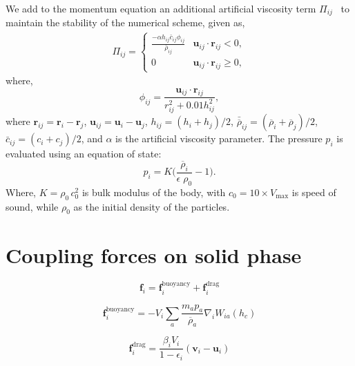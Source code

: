 \documentclass[preprint,12pt]{elsarticle}
\newcommand{\ten}[1]{\ensuremath{\mathbf{#1}}}
\begin{document}
We add to the momentum equation an additional artificial viscosity term
$\Pi_{ij}$~\cite{monaghan-review:2005} to maintain the stability of the
numerical scheme, given as,
\begin{align}
  \label{eq:mom-av}
  \Pi_{ij} =
  \begin{cases}
\frac{-\alpha h_{ij} \bar{c}_{ij} \phi_{ij}}{\bar{\rho}_{ij}}
  & \ten{u}_{ij}\cdot \ten{r}_{ij} < 0, \\
  0 & \ten{u}_{ij}\cdot \ten{r}_{ij} \ge 0,
\end{cases}
\end{align}
where,
%
\begin{equation}
  \label{eq:av-phiij}
  \phi_{ij} = \frac{\ten{u}_{ij} \cdot \ten{r}_{ij}}{r^2_{ij} + 0.01 h^2_{ij}},
\end{equation}
%
where $\ten{r}_{ij} = \ten{r}_i - \ten{r}_j$,
$\ten{u}_{ij} = \ten{u}_i - \ten{u}_j$, $h_{ij} = (h_i + h_j)/2$,
$\bar{\overline{\rho}}_{ij} = (\overline{\rho}_i + \overline{\rho}_j)/2$, $\bar{c}_{ij} = (c_i + c_j) / 2$, and
$\alpha$ is the artificial viscosity parameter.  The pressure $p_i$ is evaluated
using an equation of state:
\begin{equation}
\label{eqn:sph-eos}
  p_i = K \bigg(\frac{\overline{\rho}_i}{\epsilon \; \rho_{0}} - 1 \bigg).
\end{equation}
Where, $K=\rho_0 \, c_0^2$ is bulk modulus of the body, with
$c_0=10 \times V_{\text{max}}$ is speed of sound, while $\rho_0$ as the
initial density of the particles.



\FloatBarrier%
\section{Coupling forces on solid phase}
\label{sec:solid-fluid-coupling-force}

\begin{equation}
\label{eqn:sph-eos}
  \ten{f}_i = \ten{f}_i^{\text{buoyancy}} + \ten{f}_i^{\text{drag}}
\end{equation}

\begin{equation}
\label{eqn:f-buoyancy}
  \ten{f}_i^{\text{buoyancy}} = - V_i \sum_{a}
  \frac{m_a p_a}{\overline{\rho}_a}
  \nabla_{i} W_{ia} (h_c)
\end{equation}


\begin{equation}
\label{eqn:f-drag}
\ten{f}_i^{\text{drag}} = \frac{\beta_i V_i}{1 - \epsilon_i} (\ten{v}_i - \ten{u}_i)
\end{equation}
\end{document}
